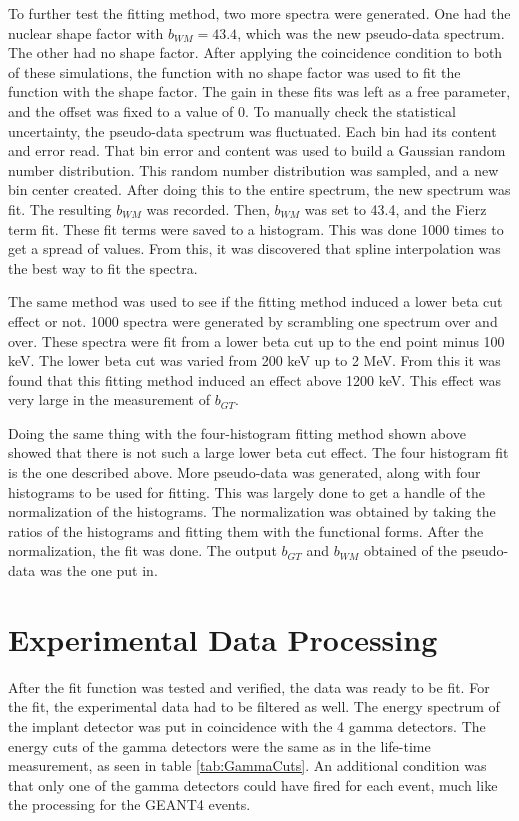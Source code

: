 \documentclass[../MaxHughesThesis.tex]{subfiles}
\begin{document}
To further test the fitting method, two more spectra were generated.
One had the nuclear shape factor with $b_{WM} = 43.4$, which was the new pseudo-data spectrum.  
The other had no shape factor.
After applying the coincidence condition to both of these simulations, the function with no shape factor was used to fit the function with the shape factor. 
The gain in these fits was left as a free parameter, and the offset was fixed to a value of 0. 
To manually check the statistical uncertainty, the pseudo-data spectrum was fluctuated.
Each bin had its content and error read. 
That bin error and content was used to build a Gaussian random number distribution.
This random number distribution was sampled, and a new bin center created.
After doing this to the entire spectrum, the new spectrum was fit.
The resulting $b_{WM}$ was recorded.
Then, $b_{WM}$ was set to 43.4, and the Fierz term fit. 
These fit terms were saved to a histogram.
This was done 1000 times to get a spread of values.
From this, it was discovered that spline interpolation was the best way to fit the spectra.

The same method was used to see if the fitting method induced a lower beta cut effect or not. 
1000 spectra were generated by scrambling one spectrum over and over.
These spectra were fit from a lower beta cut up to the end point minus 100 keV.
The lower beta cut was varied from 200 keV up to 2 MeV.
From this it was found that this fitting method induced an effect above 1200 keV.
This effect was very large in the measurement of $b_{GT}$.

Doing the same thing with the four-histogram fitting method shown above showed that there is not such a large lower beta cut effect.
The four histogram fit is the one described above. 
More pseudo-data was generated, along with four histograms to be used for fitting.
This was largely done to get a handle of the normalization of the histograms.
The normalization was obtained by taking the ratios of the histograms and fitting them with the functional forms. 
After the normalization, the fit was done.
The output $b_{GT}$ and $b_{WM}$ obtained of the pseudo-data was the one put in.

\section{Experimental Data Processing}
After the fit function was tested and verified, the data was ready to be fit. 
For the fit, the experimental data had to be filtered as well. 
The energy spectrum of the implant detector was put in coincidence with the 4 gamma detectors.
The energy cuts of the gamma detectors were the same as in the life-time measurement, as seen in table \ref{tab:GammaCuts}.
An additional condition was that only one of the gamma detectors could have fired for each event, much like the processing for the GEANT4 events.
\end{document}
